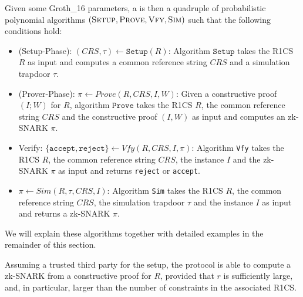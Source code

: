 Given some Groth\_16 parameters, a  is then a quadruple of probabilistic polynomial algorithms $(\textsc{Setup},\textsc{Prove},\textsc{Vfy},\textsc{Sim})$ such that the following conditions hold:
\begin{itemize}
\item (Setup-Phase): $(CRS,\tau)\leftarrow \mathtt{Setup}(R)$: Algorithm $\mathtt{Setup}$ takes the R1CS $R$ as input and computes a common reference string $CRS$ and a simulation trapdoor $\tau$.
\item (Prover-Phase): $\pi\leftarrow Prove(R,CRS,I,W)$: Given a constructive proof $(I;W)$ for $R$, algorithm $\mathtt{Prove}$ takes the R1CS $R$, the common reference string $CRS$ and the constructive proof $(I,W)$ as input and computes an zk-SNARK $\pi$.
\item Verify: $\{\mathtt{accept},\mathtt{reject}\}\leftarrow Vfy(R,CRS,I,\pi)$:   Algorithm \texttt{Vfy} takes the R1CS $R$, the common reference string $CRS$, the instance $I$ and the zk-SNARK $\pi$ as input and returns \texttt{reject} or \texttt{accept}.
\item $\pi\leftarrow Sim(R,\tau,CRS, I)$: Algorithm \texttt{Sim} takes the R1CS $R$, the common reference string $CRS$, the simulation trapdoor $\tau$ and the instance $I$ as input and returns a zk-SNARK $\pi$. 
\end{itemize}
We will explain these algorithms together with detailed examples in the remainder of this section.

Assuming a trusted third party for the setup, the protocol is  able to compute a zk-SNARK from a constructive proof for $R$, provided that $r$ is sufficiently large, and, in particular, larger than the number of constraints in the associated R1CS.

